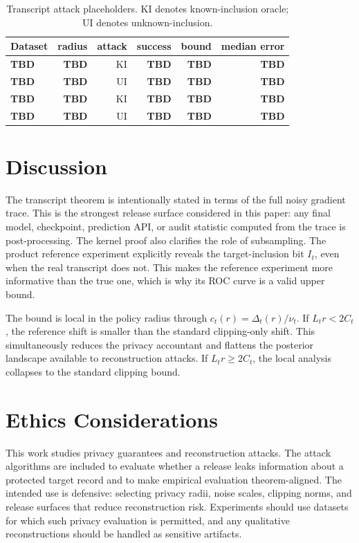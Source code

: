 \documentclass[conference,compsoc]{IEEEtran}
\newcommand{\todoresult}{\textbf{TBD}}
\begin{document}
\begin{table}[t]
\centering
\caption{Transcript attack placeholders. KI denotes known-inclusion oracle; UI denotes unknown-inclusion.}
\label{tab:attack-placeholders}
\begin{tabular}{lrrrrr}
\toprule
Dataset & radius & attack & success & bound & median error\\
\midrule
\todoresult & \todoresult & KI & \todoresult & \todoresult & \todoresult\\
\todoresult & \todoresult & UI & \todoresult & \todoresult & \todoresult\\
\todoresult & \todoresult & KI & \todoresult & \todoresult & \todoresult\\
\todoresult & \todoresult & UI & \todoresult & \todoresult & \todoresult\\
\bottomrule
\end{tabular}
\end{table}

\section{Discussion}

The transcript theorem is intentionally stated in terms of the full noisy gradient trace. This is the strongest release surface considered in this paper: any final model, checkpoint, prediction API, or audit statistic computed from the trace is post-processing. The kernel proof also clarifies the role of subsampling. The product reference experiment explicitly reveals the target-inclusion bit $I_t$, even when the real transcript does not. This makes the reference experiment more informative than the true one, which is why its ROC curve is a valid upper bound.

The bound is local in the policy radius through $c_t(r)=\Delta_t(r)/\nu_t$. If $L_t r<2C_t$, the reference shift is smaller than the standard clipping-only shift. This simultaneously reduces the privacy accountant and flattens the posterior landscape available to reconstruction attacks. If $L_t r\ge 2C_t$, the local analysis collapses to the standard clipping bound.

\section{Ethics Considerations}

This work studies privacy guarantees and reconstruction attacks. The attack algorithms are included to evaluate whether a release leaks information about a protected target record and to make empirical evaluation theorem-aligned. The intended use is defensive: selecting privacy radii, noise scales, clipping norms, and release surfaces that reduce reconstruction risk. Experiments should use datasets for which such privacy evaluation is permitted, and any qualitative reconstructions should be handled as sensitive artifacts.
\end{document}
